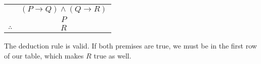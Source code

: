 \documentclass[12pt]{exam}
\def\imp{\rightarrow}
\begin{document}
\begin{questions}
   \begin{center}
     \begin{tabular}{lc}
       & $(P\imp Q) \wedge (Q \imp R)$ \\
       & $P$ \\ \hline
       $\therefore$ & $R$
     \end{tabular}
   \end{center}

   \begin{solution}
     The deduction rule is valid.  If both premises are true, we must be in the first row of our table, which makes $R$ true as well.
   \end{solution}
   \vfill

 \end{questions}
\end{document}
